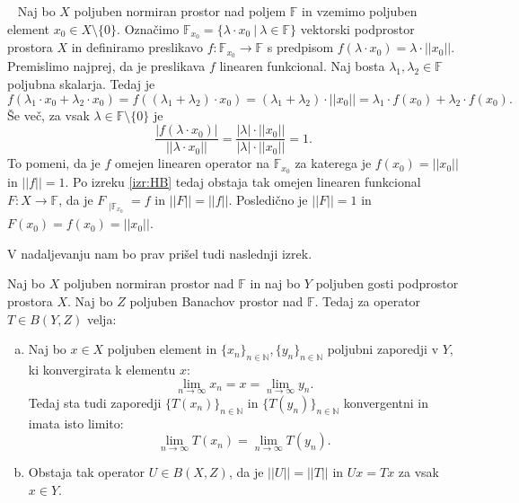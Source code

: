 \documentclass[12pt,a4paper,oneside,fleqn,openany]{book}
\newcommand{\eopf}{\raisebox{0.8ex}{\framebox{}}} %
\newenvironment{dokaz}%
{\noindent{\bf Dokaz.}\ }%
{\hfill\eopf\par\bigskip}%
\newcommand{\F}{\mathbb{F}}
\newcommand{\N}{\mathbb{N}}
\newcommand{\abs}[1]{\ensuremath{\lvert #1 \rvert}}
\newcommand{\norm}[1]{\abs{\abs{#1}}}
\newcommand{\map}[3]{\ensuremath{{#1}:{#2}\rightarrow{#3}}}
\begin{document}
\begin{dokaz}
	Naj bo $X$ poljuben normiran prostor nad poljem $\F$ in vzemimo poljuben element $x_0\in X\setminus\{0\}$. Označimo $\F_{x_0} = \{\lambda\cdot x_0~|~\lambda\in\F\}$ vektorski podprostor prostora $X$ in definiramo preslikavo $\map{f}{\F_{x_0}}{\F}$ s predpisom $f(\lambda\cdot x_0) = \lambda\cdot\norm{x_0}$. Premislimo najprej, da je preslikava $f$ linearen funkcional. Naj bosta $\lambda_1, \lambda_2\in\F$ poljubna skalarja. Tedaj je $$f(\lambda_1\cdot x_0 + \lambda_2\cdot x_0)= f((\lambda_1+\lambda_2)\cdot x_0)=(\lambda_1+\lambda_2)\cdot\norm{x_0} = \lambda_1\cdot f(x_0) + \lambda_2\cdot f(x_0).$$ Še več, za vsak $\lambda\in \F\setminus\{0\}$ je $$\frac{\abs{f(\lambda\cdot x_0)}}{\norm{\lambda\cdot x_0}} = \frac{\abs{\lambda}\cdot\norm{x_0}}{\abs{\lambda}\cdot\norm{x_0}}=1.$$ To pomeni, da je $f$ omejen linearen operator na $\F_{x_0}$ za katerega je $f(x_0) = \norm{x_0}$ in $\norm{f}=1$. Po izreku \ref{izr:HB} tedaj obstaja tak omejen linearen funkcional $\map{F}{X}{\F}$, da je $F_{\substack{|\F_{x_0}}}=f$ in $\norm{F} = \norm{f}$. Posledično je $\norm{F} = 1$ in $F(x_0) = f(x_0) = \norm{x_0}$.
\end{dokaz}
V nadaljevanju nam bo prav prišel tudi naslednji izrek.
\begin{izrek}
	\label{izr:opHB} 
	Naj bo $X$ poljuben normiran prostor nad $\F$ in naj bo $Y$ poljuben gosti podprostor prostora $X$. Naj bo $Z$ poljuben Banachov prostor nad $\F$. Tedaj za operator $T\in B(Y, Z)$ velja: \begin{enumerate}[a)]
		\item Naj bo $x\in X$ poljuben element in $\{x_n\}_{n\in\N},\{y_n\}_{n\in\N}$ poljubni zaporedji v $Y$, ki konvergirata k elementu $x$: $$\lim_{n\to \infty}x_n = x = \lim_{n\to \infty}y_n.$$ Tedaj sta tudi zaporedji $\{T(x_n)\}_{n\in\N}$ in $\{T(y_n)\}_{n\in\N}$ konvergentni in imata isto limito: $$\lim_{n\to \infty}T(x_n) = \lim_{n\to \infty}T(y_n).$$
		\item Obstaja tak operator $U\in B(X, Z)$, da je $\norm{U} = \norm{T}$ in $Ux = Tx$ za vsak $x\in Y$.
	\end{enumerate}
\end{izrek}
\end{document}
